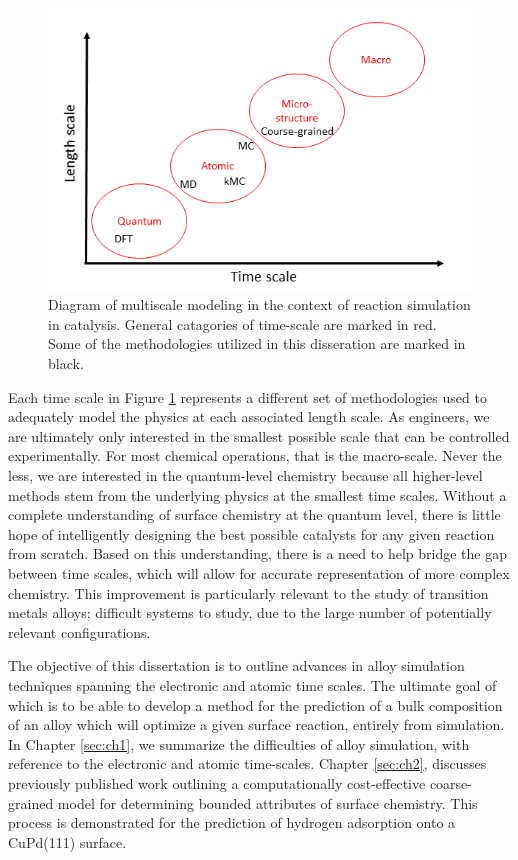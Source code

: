 \documentclass[12pt]{cmuthesis}
\begin{document}
\begin{figure}[h]
\centering
\includegraphics[width=5in]{./images/fig-multiscale.png}
\caption{Diagram of multiscale modeling in the context of reaction simulation in catalysis. General catagories of time-scale are marked in red. Some of the methodologies utilized in this disseration are marked in black. \label{fig-multiscale}}
\end{figure}

Each time scale in Figure \ref{fig-multiscale} represents a different set of methodologies used to adequately model the physics at each associated length scale. As engineers, we are ultimately only interested in the smallest possible scale that can be controlled experimentally. For most chemical operations, that is the macro-scale. Never the less, we are interested in the quantum-level chemistry because all higher-level methods stem from the underlying physics at the smallest time scales. Without a complete understanding of surface chemistry at the quantum level, there is little hope of intelligently designing the best possible catalysts for any given reaction from scratch. Based on this understanding, there is a need to help bridge the gap between time scales, which will allow for accurate representation of more complex chemistry. This improvement is particularly relevant to the study of transition metals alloys; difficult systems to study, due to the large number of potentially relevant configurations.

The objective of this dissertation is to outline advances in alloy simulation techniques spanning the electronic and atomic time scales. The ultimate goal of which is to be able to develop a method for the prediction of a bulk composition of an alloy which will optimize a given surface reaction, entirely from simulation. In Chapter \ref{sec:ch1}, we summarize the difficulties of alloy simulation, with reference to the electronic and atomic time-scales. Chapter \ref{sec:ch2}, discusses previously published work \cite{boes-2015-estim-bulk} outlining a computationally cost-effective coarse-grained model for determining bounded attributes of surface chemistry. This process is demonstrated for the prediction of hydrogen adsorption onto a CuPd(111) surface.
\end{document}
